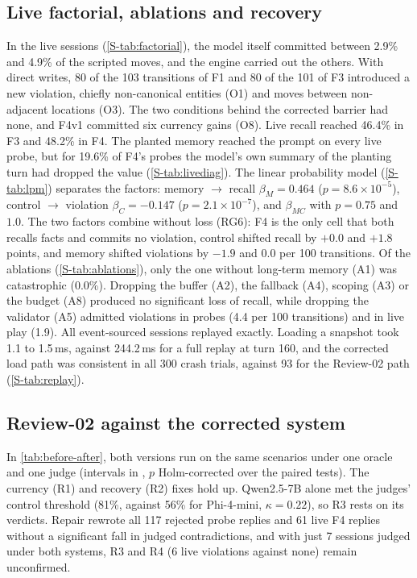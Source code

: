 \documentclass[letterpaper,journal]{IEEEtran}
\begin{document}
\subsection{Live factorial, ablations and recovery}\label{sec:factorial}
In the live sessions (\cref{S-tab:factorial}), the model itself committed between 2.9\% and 4.9\% of the scripted moves, and the engine carried out the others. With direct writes, 80 of the 103 transitions of F1 and 80 of the 101 of F3 introduced a new violation, chiefly non-canonical entities (O1) and moves between non-adjacent locations (O3). The two conditions behind the corrected barrier had none, and F4v1 committed six currency gains (O8). Live recall reached 46.4\% in F3 and 48.2\% in F4. The planted memory reached the prompt on every live probe, but for 19.6\% of F4's probes the model's own summary of the planting turn had dropped the value (\cref{S-tab:livediag}). The linear probability model (\cref{S-tab:lpm}) separates the factors: memory $\to$ recall $\beta_M=0.464$ ($p=8.6\times10^{-5}$), control $\to$ violation $\beta_C=-0.147$ ($p=2.1\times10^{-7}$), and $\beta_{MC}$ with $p=0.75$ and $1.0$. The two factors combine without loss (RG6): F4 is the only cell that both recalls facts and commits no violation, control shifted recall by $+0.0$ and $+1.8$ points, and memory shifted violations by $-1.9$ and $0.0$ per 100 transitions. Of the ablations (\cref{S-tab:ablations}), only the one without long-term memory (A1) was catastrophic (0.0\%). Dropping the buffer (A2), the fallback (A4), scoping (A3) or the budget (A8) produced no significant loss of recall, while dropping the validator (A5) admitted violations in probes (4.4 per 100 transitions) and in live play (1.9). All event-sourced sessions replayed exactly. Loading a snapshot took 1.1 to 1.5\,ms, against 244.2\,ms for a full replay at turn 160, and the corrected load path was consistent in all 300 crash trials, against 93 for the Review-02 path (\cref{S-tab:replay}).

\subsection{Review-02 against the corrected system}\label{sec:before-after}
In \cref{tab:before-after}, both versions run on the same scenarios under one oracle and one judge (intervals in , $p$ Holm-corrected over the paired tests). The currency (R1) and recovery (R2) fixes hold up. Qwen2.5-7B alone met the judges' control threshold (81\%, against 56\% for Phi-4-mini, $\kappa=0.22$), so R3 rests on its verdicts. Repair rewrote all 117 rejected probe replies and 61 live F4 replies without a significant fall in judged contradictions, and with just 7 sessions judged under both systems, R3 and R4 (6 live violations against none) remain unconfirmed.
\end{document}
